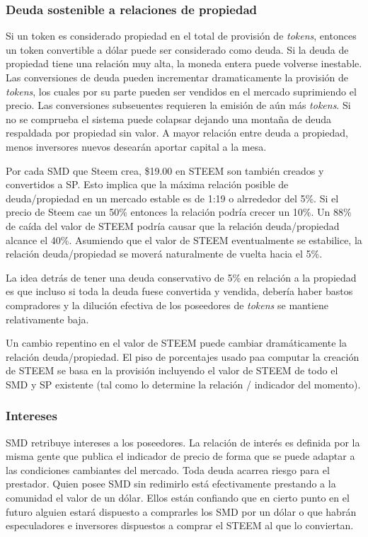 \documentclass[a4paper,titlepage,final]{article}
\begin{document}
\subsubsection{Deuda sostenible a relaciones de propiedad}

Si un token es considerado propiedad en el total de provisión de \textit{tokens}, entonces un token convertible a dólar puede ser considerado como deuda. Si la deuda de propiedad tiene una relación muy alta, la moneda entera puede volverse inestable. Las conversiones de deuda pueden incrementar dramaticamente la provisión de \textit{tokens}, los cuales por su parte pueden ser vendidos en el mercado suprimiendo el precio. Las conversiones subseuentes requieren la emisión de aún más \textit{tokens}. Si no se comprueba el sistema puede colapsar dejando una montaña de deuda respaldada por propiedad sin valor. A mayor relación entre deuda a propiedad, menos inversores nuevos desearán aportar capital a la mesa.

Por cada SMD que Steem crea, \$19.00 en STEEM son también creados y convertidos a SP. Esto implica que la máxima relación posible de deuda/propiedad en un mercado estable es de 1:19 o alrrededor del 5\%. Si el precio de Steem cae un 50\% entonces la relación podría crecer un 10\%. Un 88\% de caída del valor de STEEM podría causar que la relación deuda/propiedad alcance el 40\%. Asumiendo que el valor de STEEM eventualmente se estabilice, la relación deuda/propiedad se moverá naturalmente de vuelta hacia el 5\%.

La idea detrás de tener una deuda conservativo de 5\% en relación a la propiedad es que incluso si toda la deuda fuese convertida y vendida, debería haber bastos compradores y la dilución efectiva de los poseedores de \textit{tokens} se mantiene relativamente baja.

Un cambio repentino en el valor de STEEM puede cambiar dramáticamente la relación deuda/propiedad. El piso de porcentajes usado paa computar la creación de STEEM se basa en la provisión incluyendo el valor de STEEM de todo el SMD y SP existente (tal como lo determine la relación / indicador del momento).

\subsubsection{Intereses}

SMD retribuye intereses a los poseedores. La relación de interés es definida por la misma gente que publica el indicador de precio de forma que se puede adaptar a las condiciones cambiantes del mercado. Toda deuda acarrea riesgo para el prestador. Quien posee SMD sin redimirlo está efectivamente prestando a la comunidad el valor de un dólar. Ellos están confiando que en cierto punto en el futuro alguien estará dispuesto a comprarles los SMD por un dólar o que habrán especuladores e inversores dispuestos a comprar el STEEM al que lo conviertan.
\end{document}
